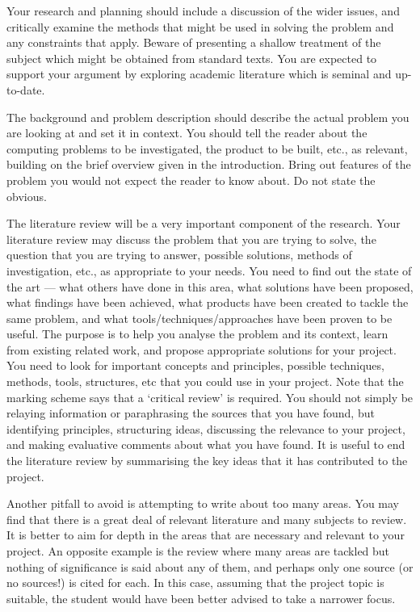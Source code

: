 {    Your research and planning should include a discussion of the wider issues, and critically examine the methods that might be used in solving the problem and any constraints
    that apply. Beware of presenting a shallow treatment of the subject which might be obtained from standard texts. You are expected to support your argument by exploring
    academic literature which is seminal and up-to-date.

    The background and problem description should describe the actual problem you are looking at and set it in context. You should tell the reader about the computing problems
    to be investigated, the product to be built, etc., as relevant, building on the brief overview given in the introduction. Bring out features of the problem you would not
    expect the reader to know about. Do not state the obvious.

    The literature review will be a very important component of the research. Your literature review may discuss the problem that you are trying to solve, the question that
    you are trying to answer, possible solutions, methods of investigation, etc., as appropriate to your needs. You need to find out the state of the art --- what others have
    done in this area, what solutions have been proposed, what findings have been achieved, what products have been created to tackle the same problem, and what
    tools/techniques/approaches have been proven to be useful. The purpose is to help you analyse the problem and its context, learn from existing related work, and
    propose appropriate solutions for your project. You need to look for important concepts and principles, possible techniques, methods, tools, structures, etc that
    you could use in your project.
    Note that the marking scheme says that a \enquote*{critical review} is required. You should not simply be relaying information or paraphrasing the sources that you have found, but
    identifying principles, structuring ideas, discussing the relevance to your project, and making evaluative comments about what you have found. It is useful to end the
    literature review by summarising the key ideas that it has contributed to the project.

    Another pitfall to avoid is attempting to write about too many areas. You may find that there is a great deal of relevant literature and many subjects to review. It is
    better to aim for depth in the areas that are necessary and relevant to your project. An opposite example is the review where many areas are tackled but nothing
    of significance is said about any of them, and perhaps only one source (or no sources!) is cited for each. In this case, assuming that the project topic is suitable, the
    student would have been better advised to take a narrower focus.

}
